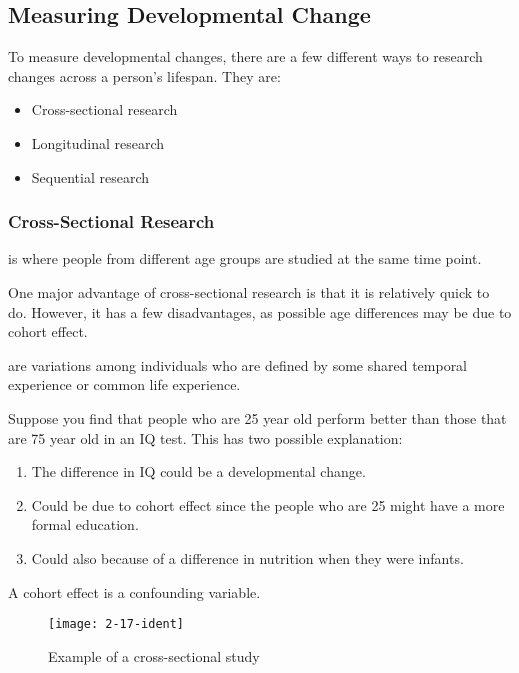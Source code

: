 \documentclass[../main/main.tex]{subfiles}
\begin{document}
\subsection{Measuring Developmental Change}
To measure developmental changes, there are a few different ways to research changes across a person's lifespan. They are:
\begin{itemize}
\item Cross-sectional research
\item Longitudinal research
\item Sequential research
\end{itemize}

\subsubsection{Cross-Sectional Research}
\begin{definition}
 is where people from different age groups are studied at the same time point. 
\end{definition}
One major advantage of cross-sectional research is that it is relatively quick to do. However, it has a few disadvantages, as possible age differences may be due to cohort effect.

\begin{definition} 
 are  variations among individuals who are defined by some shared temporal experience or common life experience.
\end{definition}
\begin{example}
  Suppose you find that people who are 25 year old perform better than those that are 75 year old in an IQ test. This has two possible explanation:
  \begin{enumerate}
    \item The difference in IQ could be a developmental change.
          \item Could be due to cohort effect since the people who are 25 might have a more formal education.
          \item Could also because of a difference in nutrition when they were infants.
  \end{enumerate}
\end{example}
\begin{remark}
A cohort effect is a confounding variable.
\end{remark}

\begin{figure}[htpb]
  \centering
  \texttt{[image: 2-17-ident]}
  \caption{Example of a cross-sectional study}
  \label{2-17-ident}
\end{figure}
\end{document}
